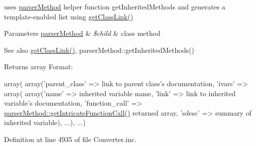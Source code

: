 uses \hyperlink{classparser_method}{parser\-Method} helper function get\-Inherited\-Methods and generates a template-\/enabled list using \hyperlink{class_converter_a800228e73b38402c365fec0ab9961c1d}{get\-Class\-Link()} 
\begin{DoxyParams}[1]{\-Parameters}
\hyperlink{classparser_method}{parser\-Method} & {\em \$child} & class method \\
\hline
\end{DoxyParams}
\begin{DoxySeeAlso}{\-See also}
\hyperlink{class_converter_a800228e73b38402c365fec0ab9961c1d}{get\-Class\-Link()}, parser\-Method\-::get\-Inherited\-Methods() 
\end{DoxySeeAlso}
\begin{DoxyReturn}{\-Returns}
array \-Format\-: 
\begin{DoxyPre}
 array(
   array('parent\_class' => link to parent class's documentation,
         'ivars' =>
            array(
              array('name' => inherited variable name,
                    'link' => link to inherited variable's documentation,
                    'function\_call' => \hyperlink{classparser_method_a8990974e1e3504ebf1ec7568ba204d75}{parserMethod::getIntricateFunctionCall()}
                                       returned array,
                    'sdesc' => summary of inherited variable),
              ...),
   ...)
 \end{DoxyPre}
 
\end{DoxyReturn}


\-Definition at line 4935 of file \-Converter.\-inc.


